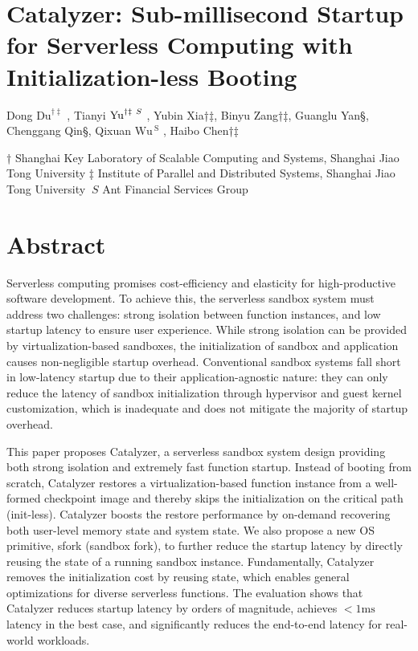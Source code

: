 \documentclass[
  10
]{article}
\author{}
\date{}
\begin{document}
\section{Catalyzer: Sub-millisecond Startup for Serverless Computing
with Initialization-less
Booting}\label{catalyzer-sub-millisecond-startup-for-serverless-computing-with-initialization-less-booting}

Dong \(\mathrm { D u } ^ { \dag \ddag }\) , Tianyi
\(\mathrm { Y u } ^ { \dag \ddag \mathinner { \ S } }\) , Yubin Xia†‡,
Binyu Zang†‡, Guanglu Yan§, Chenggang Qin§, Qixuan
\(\mathrm { W u ^ { \ S } }\) , Haibo Chen†‡

† Shanghai Key Laboratory of Scalable Computing and Systems, Shanghai
Jiao Tong University ‡ Institute of Parallel and Distributed Systems,
Shanghai Jiao Tong University \(\ S\) Ant Financial Services Group

\section{Abstract}\label{abstract}

Serverless computing promises cost-efficiency and elasticity for
high-productive software development. To achieve this, the serverless
sandbox system must address two challenges: strong isolation between
function instances, and low startup latency to ensure user experience.
While strong isolation can be provided by virtualization-based
sandboxes, the initialization of sandbox and application causes
non-negligible startup overhead. Conventional sandbox systems fall short
in low-latency startup due to their application-agnostic nature: they
can only reduce the latency of sandbox initialization through hypervisor
and guest kernel customization, which is inadequate and does not
mitigate the majority of startup overhead.

This paper proposes Catalyzer, a serverless sandbox system design
providing both strong isolation and extremely fast function startup.
Instead of booting from scratch, Catalyzer restores a
virtualization-based function instance from a well-formed checkpoint
image and thereby skips the initialization on the critical path
(init-less). Catalyzer boosts the restore performance by on-demand
recovering both user-level memory state and system state. We also
propose a new OS primitive, sfork (sandbox fork), to further reduce the
startup latency by directly reusing the state of a running sandbox
instance. Fundamentally, Catalyzer removes the initialization cost by
reusing state, which enables general optimizations for diverse
serverless functions. The evaluation shows that Catalyzer reduces
startup latency by orders of magnitude, achieves
\({ < } 1 \mathrm { m s }\) latency in the best case, and significantly
reduces the end-to-end latency for real-world workloads.
\end{document}
